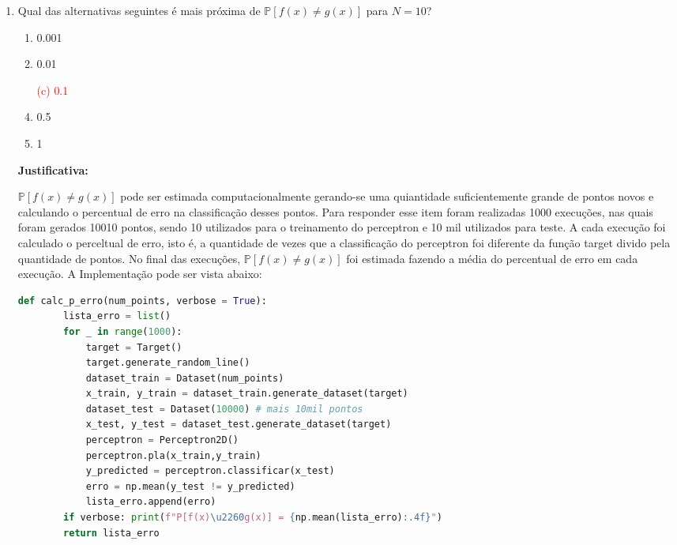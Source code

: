 \begin{enumerate}
    \item Qual das alternativas seguintes é mais próxima de $\mathbb{P}[f(x) \neq g(x)]$ para $N = 10$?
    
    \begin{enumerate}
        \item 0.001
        \item 0.01
        \item[\textcolor{red}{(c)}]\textcolor{red}{0.1}\addtocounter{enumii}{1}
        \item 0.5
        \item 1
    \end{enumerate}
     
    \par

    \textbf{Justificativa:}
     
    $\mathbb{P}[f(x) \neq g(x)]$ pode ser estimada computacionalmente gerando-se uma quiantidade suficientemente grande de pontos novos e calculando o percentual de erro na classificação desses pontos. Para responder esse item foram realizadas 1000 execuções, nas quais foram gerados 10010 pontos, sendo 10 utilizados para o treinamento do perceptron e 10 mil utilizados para teste. A cada execução foi calculado o perceltual de erro, isto é, a quantidade de vezes que a classificação do perceptron foi diferente da função target divido pela quantidade de pontos. No final das execuções, $\mathbb{P}[f(x) \neq g(x)]$ foi estimada fazendo a média do percentual de erro em cada execução. A Implementação pode ser vista abaixo:

    \begin{lstlisting}[language=Python, caption=Cálculo da probabilidade de erro, label=cod:perceptron_p_erro]
        def calc_p_erro(num_points, verbose = True):
        lista_erro = list()
        for _ in range(1000):
            target = Target()
            target.generate_random_line()
            dataset_train = Dataset(num_points)
            x_train, y_train = dataset_train.generate_dataset(target)
            dataset_test = Dataset(10000) # mais 10mil pontos
            x_test, y_test = dataset_test.generate_dataset(target)
            perceptron = Perceptron2D()
            perceptron.pla(x_train,y_train)
            y_predicted = perceptron.classificar(x_test)
            erro = np.mean(y_test != y_predicted)
            lista_erro.append(erro)
        if verbose: print(f"P[f(x)\u2260g(x)] = {np.mean(lista_erro):.4f}")
        return lista_erro
    \end{lstlisting}


\end{enumerate}
